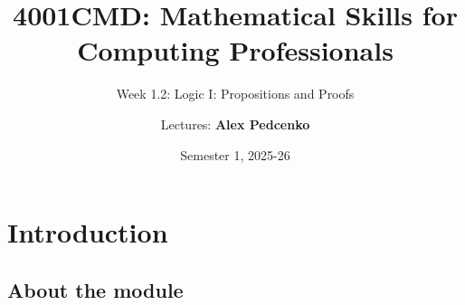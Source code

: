 \documentclass[11pt,aspectratio=1610]{beamer}
\title{4001CMD: Mathematical Skills for Computing Professionals}
\subtitle[Week 1.2: Logic 1]{Week 1.2: Logic I: Propositions and Proofs}
\date{Semester 1, 2025-26}
\author{Lectures: \textbf{Alex Pedcenko}}
\begin{document}
	
	\begin{frame}
		\titlepage
	\end{frame}


\section{Introduction}	
%		
%
%
%	
%		
%		




\subsection*{About the module}	
\end{document}
